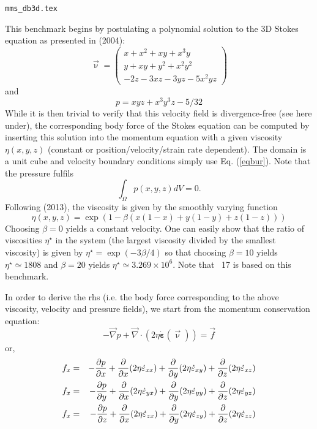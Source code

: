 \begin{flushright} {\tiny {\color{gray} \tt mms\_db3d.tex}} \end{flushright}

This benchmark begins by postulating a polynomial solution to the 3D Stokes equation 
as presented in \textcite{dobo04} (2004):
\begin{equation}
\vec{\upnu}
=
\left(
\begin{array}{c}
x+x^2+xy+x^3y \\
y + xy + y^2 + x^2 y^2\\
-2z - 3xz - 3yz - 5x^2 yz
\end{array}
\right)
\label{eqbur}
\end{equation}
and
\begin{equation}
p = xyz + x^3 y^3z - 5/32
\end{equation}
While it is then trivial to verify that this velocity field is divergence-free (see here under),  
the corresponding body force of the Stokes equation can be computed by  
inserting this solution into the momentum equation with a given viscosity $\eta(x,y,z)$
(constant or position/velocity/strain rate dependent). 
The domain is a unit cube and velocity boundary conditions 
simply use Eq. (\ref{eqbur}). Note that the pressure fulfils 
\[
\int_\Omega p(x,y,z) dV = 0.  
\]
Following \textcite{busa13} (2013), the viscosity is given by the smoothly varying function
\begin{equation}
\eta(x,y,z) = \exp(1 - \beta(x(1 - x) + y(1 - y) + z(1 - z)))
\end{equation}
Choosing $\beta=0$ yields a constant velocity.
One can easily show that the ratio of viscosities $\eta^\star$
in the system (the largest viscosity divided by the smallest viscosity) 
is given by $\eta^\star=\exp(-3\beta/4)$ so that choosing $\beta=10$ yields
$\eta^\star\simeq 1808$ and $\beta=20$ yields $\eta^\star\simeq 3.269\times10^6$.
Note that \stone~17 is based on this benchmark.

In order to derive the rhs (i.e. the body force 
corresponding to the above viscosity, velocity and pressure fields), 
we start from the momentum conservation equation:
\[
-{\vec \nabla}p + {\vec \nabla}\cdot (2 \eta \dot{\bm \varepsilon}(\vec\upnu)) = {\vec f}
\]
or, 
\begin{eqnarray}
f_x 
&=& -\frac{\partial p}{\partial x} 
+\frac{\partial}{\partial x} (2\eta \dot{\varepsilon}_{xx})
+\frac{\partial}{\partial y} (2\eta \dot{\varepsilon}_{xy})
+\frac{\partial}{\partial z} (2\eta \dot{\varepsilon}_{xz}) \nonumber\\
f_x 
&=& -\frac{\partial p}{\partial y} 
+\frac{\partial}{\partial x} (2\eta \dot{\varepsilon}_{yx})
+\frac{\partial}{\partial y} (2\eta \dot{\varepsilon}_{yy})
+\frac{\partial}{\partial z} (2\eta \dot{\varepsilon}_{yz}) \nonumber\\
f_x 
&=& -\frac{\partial p}{\partial z} 
+\frac{\partial}{\partial x} (2\eta \dot{\varepsilon}_{zx})
+\frac{\partial}{\partial y} (2\eta \dot{\varepsilon}_{zy})
+\frac{\partial}{\partial z} (2\eta \dot{\varepsilon}_{zz}) \nonumber
\end{eqnarray}

